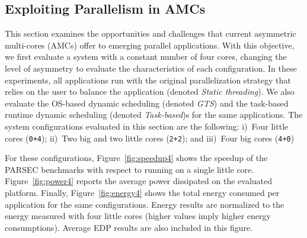 \subsection{Exploiting Parallelism in AMCs}


This section examines the opportunities and challenges that current asymmetric multi-cores (AMCs) offer to emerging parallel applications. With this objective, we first evaluate a system with a constant number of four cores, changing the level of asymmetry to evaluate the characteristics of each configuration. In these experiments, all applications run with the original parallelization strategy that relies on the user to balance the application (denoted \emph{Static threading}). We also evaluate the OS-based dynamic scheduling (denoted \emph{GTS}) and the task-based runtime dynamic scheduling (denoted \emph{Task-based})s for the same applications. 
The system configurations evaluated in this section are the following:
i)~Four little cores (\texttt{0+4}); ii)~Two big and two little cores (\texttt{2+2}); and iii)~Four 
big cores (\texttt{4+0})

For these configurations, Figure~\ref{fig:speedup4} shows the speedup of the PARSEC benchmarks with respect to running on a single little core. Figure~\ref{fig:power4} reports the average power dissipated on the evaluated platform. Finally, Figure~\ref{fig:energy4} shows the total energy consumed per application for the same configurations. Energy results are normalized to the energy measured with four little cores (higher values imply higher energy consumptions). Average EDP results are also included in this figure.

